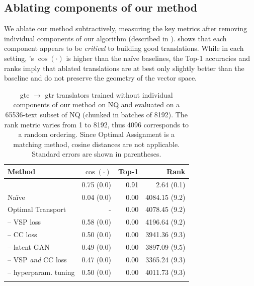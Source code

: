 \subsection{Ablating components of our method}

We ablate our method subtractively, measuring the key metrics after removing individual components of our algorithm (described in ).   shows that each component appears to be \textit{critical} to building good translations. While in each setting, \atk{}'s $\cos(\cdot)$ is higher than the naïve baselines, the Top-1 accuracies and ranks imply that ablated \atk{} translations are at best only slightly better than the baseline and do not preserve the geometry of the vector space.

\begin{table}[!ht]
    \centering
    \begin{tabular}{lrrr}
        \toprule
        Method & $\cos(\cdot)$ & Top-1 & Rank\\
        \midrule
        \atk{}&0.75 {\scriptsize (0.0)} & 0.91 & 2.64 {\scriptsize (0.1)}\\
        Naïve&0.04 {\scriptsize (0.0)} & 0.00 & 4084.15 {\scriptsize (9.2)}\\
        Optimal Transport& - & 0.00 & 4078.45 {\scriptsize (9.2)}\\
        \midrule
        -- VSP loss&0.58 {\scriptsize (0.0)} & 0.00 & 4196.64 {\scriptsize (9.2)}\\
        -- CC loss&0.50 {\scriptsize (0.0)} & 0.00 & 3941.36 {\scriptsize (9.3)}\\
        -- latent GAN&0.49 {\scriptsize (0.0)} & 0.00 & 3897.09 {\scriptsize (9.5)}\\
        -- VSP \textit{and} CC loss&0.47 {\scriptsize (0.0)} & 0.00 & 3365.24 {\scriptsize (9.3)}\\
        -- hyperparam. tuning&0.50 {\scriptsize (0.0)} & 0.00 & 4011.73 {\scriptsize (9.3)}\\
        \bottomrule\\[-1.6ex]
    \end{tabular}
    \caption{gte $\to$ gtr translators trained without individual components of our method on NQ and evaluated on a 65536-text subset of NQ (chunked in batches of 8192). The rank metric varies from 1 to 8192, thus 4096 corresponds to a random ordering. Since Optimal Assignment is a matching method, cosine distances are not applicable. Standard errors are shown in parentheses.}
    \label{tab:loss_ablation}
\end{table}




